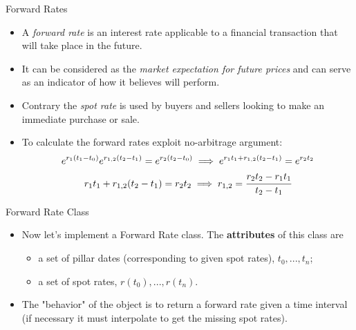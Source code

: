 \documentclass{beamer}
\begin{document}
\begin{frame}{Forward Rates}
  \begin{itemize}
  \item A \emph{forward rate} is an interest rate applicable to a financial transaction that will take place in the future.
  \item It can be considered as the \emph{market expectation for future prices} and can serve as an indicator of how it believes will perform.
  \item Contrary the \emph{spot rate} is used by buyers and sellers looking to make an immediate purchase or sale.
  \item To calculate the forward rates exploit no-arbitrage argument:
    \begin{equation}
      \begin{gathered}
        e^{r_1 (t_1-t_0)}e^{r_{1,2}(t_2 - t_1)} = e^{r_2 (t_2-t_0)} \implies e^{r_1 t_1 + r_{1,2}(t_2 - t_1)} = e^{r_2 t_2} \\
        r_1 t_1 + r_{1,2}(t_2 - t_1) = r_2 t_2 \implies r_{1,2} = \cfrac{r_2 t_2 - r_1 t_1 }{t_2 - t_1}
      \end{gathered}
    \end{equation}
  \end{itemize}
\end{frame}

\begin{frame}{Forward Rate Class}
  \begin{itemize}
  \item Now let's implement a Forward Rate class. The \textbf{attributes} of this class are
      \begin{itemize}
      \item a set of pillar dates (corresponding to given spot rates), $t_0,...,t_{n}$;
      \item a set of spot rates, $r(t_0),...,r(t_{n})$.
      \end{itemize}
  \item The "behavior" of the object is to return a forward rate given a time interval (if necessary it must interpolate to get the missing spot rates).
  \end{itemize}
\end{frame}
\end{document}
